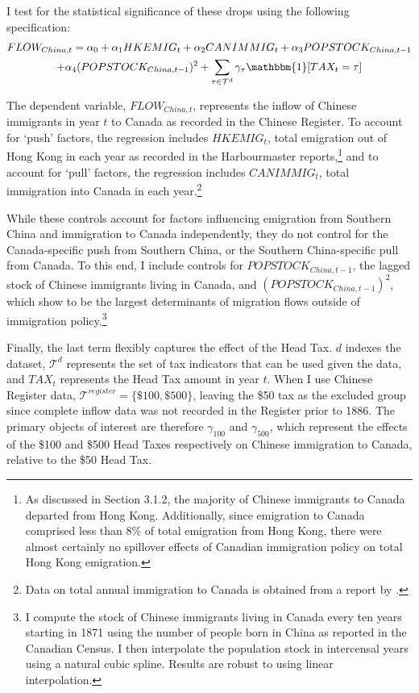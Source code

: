 I test for the statistical significance of these drops using the following specification: 
\begin{multline}
    \label{eq:immflow1}
    FLOW_{China,t} = \alpha_0 + \alpha_1 HKEMIG_t + \alpha_2 CANIMMIG_t + \alpha_3 POPSTOCK_{China, t-1} \\ + \alpha_4 (POPSTOCK_{China, t-1})^2 + \sum_{\tau \in \mathcal{T}^d} \gamma_\tau \mathbbm{1}[TAX_t = \tau]
\end{multline}

The dependent variable, $FLOW_{China,t}$, represents the inflow of Chinese immigrants in year $t$ to Canada as recorded in the Chinese Register. To account for `push' factors, the regression includes $HKEMIG_t$, total emigration out of Hong Kong in each year as recorded in the Harbourmaster reports,\footnote{As discussed in Section 3.1.2, the majority of Chinese immigrants to Canada departed from Hong Kong. Additionally, since emigration to Canada comprised less than 8\% of total emigration from Hong Kong, there were almost certainly no spillover effects of Canadian immigration policy on total Hong Kong emigration.} and to account for `pull' factors, the regression includes $CANIMMIG_t$, total immigration into Canada in each year.\footnote{Data on total annual immigration to Canada is obtained from a report by \citet{canimm}.}

While these controls account for factors influencing emigration from Southern China and immigration to Canada independently, they do not control for the Canada-specific push from Southern China, or the Southern China-specific pull from Canada. To this end, I include controls for $POPSTOCK_{China,t-1}$, the lagged stock of Chinese immigrants living in Canada, and $(POPSTOCK_{China,t-1})^2$, which \citet{Clarketal2007} show to be the largest determinants of migration flows outside of immigration policy.\footnote{I compute the stock of Chinese immigrants living in Canada every ten years starting in 1871 using the number of people born in China as reported in the Canadian Census. I then interpolate the population stock in intercensal years using a natural cubic spline. Results are robust to using linear interpolation.}

Finally, the last term flexibly captures the effect of the Head Tax. $d$ indexes the dataset, $\mathcal{T}^d$ represents the set of tax indicators that can be used given the data, and $TAX_t$ represents the Head Tax amount in year $t$. When I use Chinese Register data, $\mathcal{T}^{register} = \{\$100,\$500\}$, leaving the \$50 tax as the excluded group since complete inflow data was not recorded in the Register prior to 1886. The primary objects of interest are therefore $\gamma_{100}$ and $\gamma_{500}$, which represent the effects of the \$100 and \$500 Head Taxes respectively on Chinese immigration to Canada, relative to the \$50 Head Tax.

